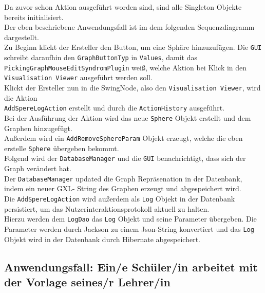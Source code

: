 \documentclass[enabledeprecatedfontcommands,fontsize=11pt,paper=a4,twoside]{scrartcl}
\begin{document}
Da zuvor schon Aktion ausgeführt worden sind, sind alle Singleton Objekte bereits initialisiert. \\
Der eben beschriebene Anwendungsfall ist im dem folgenden Sequenzdiagramm dargestellt. \\
Zu Beginn klickt der Ersteller den Button, um eine Sphäre hinzuzufügen. Die \texttt{GUI} schreibt daraufhin den \texttt{GraphButtonTyp} in \texttt{Values}, damit das \texttt{PickingGraphMouseEditSyndromPlugin} weiß, welche Aktion bei Klick in den \texttt{Visualisation Viewer} ausgeführt werden soll. \\
Klickt der Ersteller nun in die SwingNode, also den  \texttt{Visualisation Viewer}, wird die Aktion\\ \texttt{AddSpereLogAction} erstellt und durch die \texttt{ActionHistory} ausgeführt. \\
Bei der Ausführung der Aktion wird das neue \texttt{Sphere} Objekt erstellt und dem Graphen hinzugefügt. \\
Außerdem wird ein \texttt{AddRemoveSphereParam} Objekt erzeugt, welche die eben erstelle \texttt{Sphere} übergeben bekommt. \\
Folgend wird der \texttt{DatabaseManager} und die \texttt{GUI} benachrichtigt, dass sich der Graph verändert hat. \\
Der \texttt{DatabaseManager} updated die Graph Repräsenation in der Datenbank, indem ein neuer GXL- String des Graphen erzeugt und abgespeichert wird.\\
Die \texttt{AddSpereLogAction} wird außerdem als \texttt{Log} Objekt in der Datenbank persistiert, um das Nutzerinteraktionsprotokoll aktuell zu halten. \\
Hierzu werden dem \texttt{LogDao} das \texttt{Log} Objekt und seine Parameter übergeben. Die Parameter werden durch Jackson zu einem Json-String konvertiert und das \texttt{Log} Objekt wird in der Datenbank durch Hibernate abgespeichert.










\newpage

\subsection{Anwendungsfall: Ein/e Schüler/in arbeitet mit der Vorlage seines/r Lehrer/in}
\end{document}
